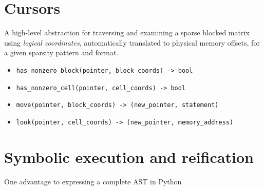 \section{Cursors}



    A high-level abstraction for traversing and examining a sparse blocked matrix using \emph{logical coordinates}, automatically translated to physical memory offsets, for a given sparsity pattern and format. 
    \begin{itemize}
    \item \verb|has_nonzero_block(pointer, block_coords) -> bool|
    \item \verb|has_nonzero_cell(pointer, cell_coords) -> bool|
    \item \verb|move(pointer, block_coords) -> (new_pointer, statement)|
    \item \verb|look(pointer, cell_coords) -> (new_pointer, memory_address)|
    \end{itemize}

\section{Symbolic execution and reification}

One advantage to expressing a complete AST in Python
